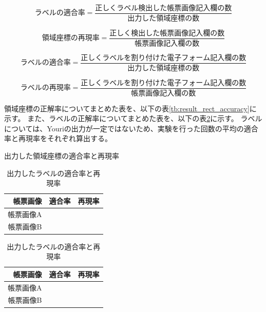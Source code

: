\begin{equation}
    ラベルの適合率=\frac{正しくラベル検出した帳票画像記入欄の数}{出力した領域座標の数}
\end{equation}

\begin{equation}
    領域座標の再現率=\frac{正しく検出した帳票画像記入欄の数}{帳票画像記入欄の数}
\end{equation}

\begin{equation}
    ラベルの適合率=\frac{正しくラベルを割り付けた電子フォーム記入欄の数}{出力した領域座標の数}
\end{equation}

\begin{equation}
    ラベルの再現率=\frac{正しくラベルを割り付けた電子フォーム記入欄の数}{帳票画像記入欄の数}
\end{equation}

領域座標の正解率についてまとめた表を、以下の表\ref{tb:result_rect_accuracy}に示す。
また、ラベルの正解率についてまとめた表を、以下の表\ref{tb:result_label_accuracy}に示す。
ラベルについては、Youriの出力が一定ではないため、実験を行った回数の平均の適合率と再現率をそれぞれ算出する。

\begin{table}[t]
    \centering
    \begin{minipage}[h]{0.47\linewidth}
        \caption{出力した領域座標の適合率と再現率}
        \label{tb:result_rect_accuracy}
        \centering
        \begin{tabular}{r|c|c}
            帳票画像 & 適合率 & 再現率 \\
            \hline \hline
            帳票画像A &  & \\
            帳票画像B &  &  \\
        \end{tabular}
    \end{minipage}
    \begin{minipage}[h]{0.47\linewidth}
        \caption{出力したラベルの適合率と再現率}
        \label{tb:result_label_accuracy}
        \centering
        \begin{tabular}{r|c|c}
            帳票画像 & 適合率 & 再現率 \\
            \hline \hline
            帳票画像A &  & \\
            帳票画像B &  &  \\
        \end{tabular}
    \end{minipage}
\end{table}

